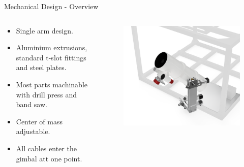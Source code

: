 \documentclass[11pt, aspectratio=169]{beamer}
\begin{document}
\begin{frame}[c]{Mechanical Design - Overview}
       \begin{columns}[t]
            \begin{column}{.5\textwidth}
                \begin{itemize}
                    \item Single arm design. 
                    \item Aluminium extrusions, standard t-slot fittings and steel plates.
                    \item Most parts machinable with drill press and band saw. 
                    \item Center of mass adjustable.
                    \item All cables enter the gimbal att one point.
                \end{itemize}
            \end{column}

            \begin{column}{.5\textwidth}
                \begin{figure}
                     \includegraphics[height=1\textheight]{mechanical/overview.png}
                \end{figure}
            \end{column}
        \end{columns}
\end{frame}
\end{document}
